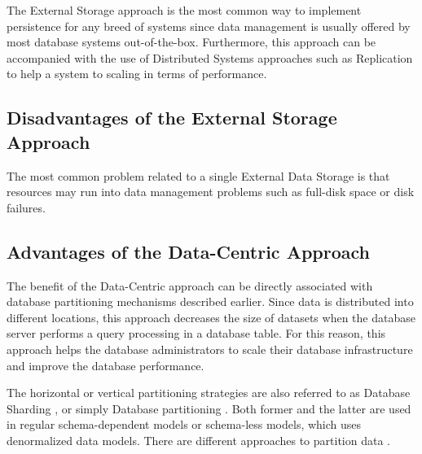 The External Storage approach is the most common way to implement persistence
for any breed of systems since data management is usually offered by most
database systems out-of-the-box. Furthermore, this approach can be accompanied
with the use of Distributed Systems approaches such as Replication to help a
system to scaling in terms of performance.

\subsection{Disadvantages of the External Storage Approach}

The most common problem related to a single External Data Storage is that 
resources may run into data management problems such as full-disk space or
disk failures.

\subsection{Advantages of the Data-Centric Approach}

The benefit of the Data-Centric approach can be directly associated with
database partitioning mechanisms described earlier. Since data is distributed
into different locations, this approach decreases the size of datasets when the
database server performs a query processing in a database table. For this
reason, this approach helps the database administrators to scale their database
infrastructure and improve the database performance.

The horizontal or vertical partitioning strategies are also referred to as
Database Sharding \cite{db-shard-discussion}, or simply Database partitioning
\cite{db-table-partition, db-partitioning-relational}. Both former and the
latter are used in regular schema-dependent models or schema-less models,
which uses denormalized data models. There are different approaches to
partition data \cite{db-shard-schemas, db-partitioning-relational,
db-partitioning-relational-oracle}.

